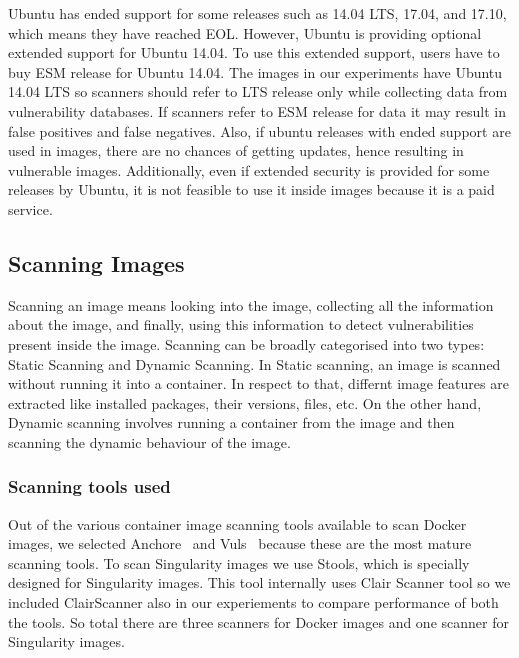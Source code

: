 \documentclass[a4paper,num-refs]{oup-contemporary}
\newcommand{\rom}[1]{\lowercase\expandafter{\romannumeral #1\relax}}
\begin{document}
Ubuntu has ended support for some releases such as 14.04 LTS,
17.04, and 17.10, which means they have reached EOL. However, Ubuntu is providing optional extended support for Ubuntu 14.04.
To use this extended support, users have to buy ESM release for Ubuntu 14.04.
The images in our experiments have Ubuntu 14.04 LTS so scanners should refer
to LTS release only while collecting data from vulnerability databases. If scanners refer to ESM release for data it may result
in false positives and false negatives.
Also, if ubuntu releases with ended support are used in images, there are no chances of getting updates, hence
resulting in vulnerable images. Additionally, even if extended security is provided for some releases by Ubuntu, it is
not feasible to use it inside images because it is a paid service. 

\subsection{Scanning Images}

Scanning an image means looking into the image, collecting all the information about the image, and
finally, using this information to detect vulnerabilities present inside the image.
Scanning can be broadly categorised into two types: \rom{1} Static Scanning and \rom{2}
Dynamic Scanning.
In Static scanning, an image is scanned without running it into a container. In respect to that,
differnt image features are extracted like installed packages, their versions, files, etc.
On the other hand, Dynamic scanning involves running a container from the image and then scanning the
dynamic behaviour of the image.

\subsubsection{Scanning tools used}
\begin{comments}
Out of the various container image scanning tools available to scan Docker images,
we selected Anchore~\cite{github_2019}
and Vuls~\cite{future-architect_2019} because these are the most mature scanning tools. To scan Singularity images
we use Stools, which is specially designed for Singularity images. This tool internally uses
Clair Scanner tool so we included ClairScanner also in our experiements to compare
performance of both the tools. So total there are three scanners for Docker images
and one scanner for Singularity images.
\end{comments}
\end{document}
